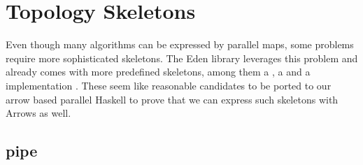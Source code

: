 \section{Topology Skeletons}
Even though many algorithms can be expressed by parallel maps, some problems require more sophisticated skeletons. The Eden library leverages this problem and already comes with more predefined skeletons, among them a , a  and a  implementation \cite{eden_cefp, eden_skel_topology}. These seem like reasonable candidates to be ported to our arrow based parallel Haskell to prove that we can express such skeletons with Arrows as well.

\subsection{pipe}

